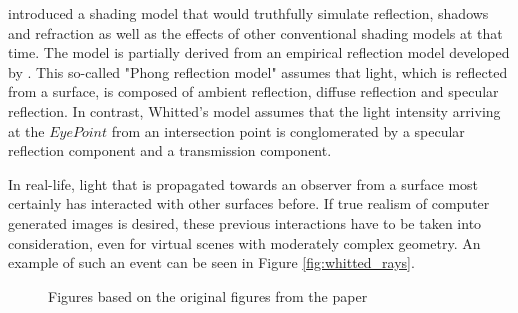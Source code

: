 \cite{whitted1979improved} introduced a shading model that would truthfully simulate reflection, shadows and refraction as well as the effects of other conventional shading models at that time.  
The model is partially derived from an empirical reflection model developed by \cite{phong1975illumination}. This so-called "Phong reflection model" assumes that light, which is reflected from a surface, is composed of ambient reflection, diffuse reflection and specular reflection.
In contrast, Whitted's model assumes that the light intensity arriving at the $Eye Point$ from an intersection point is conglomerated by a specular reflection component and a transmission component. 

In real-life, light that is propagated towards an observer from a surface most certainly has interacted with other surfaces before. If true realism of computer generated images is desired, these previous interactions have to be taken into consideration, even for virtual scenes with moderately complex geometry. An example of such an event can be seen in Figure \ref{fig:whitted_rays}.

\begin{figure}
	\centering
	\hfill
	\caption{Figures based on the original figures from the paper  \cite{whitted1979improved}}
\end{figure}

